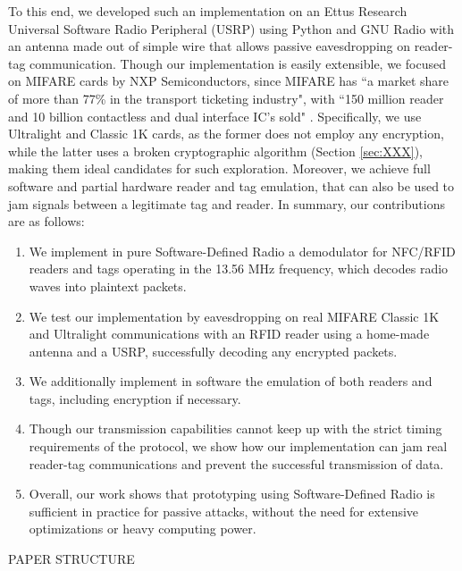 \documentclass[fleqn,10pt]{SelfArx} %
\begin{document}
To this end, we developed such an implementation on an Ettus Research Universal Software Radio Peripheral (USRP) using Python and GNU Radio with an antenna made out of simple wire that allows passive eavesdropping on reader-tag communication. Though our implementation is easily extensible, we focused on MIFARE cards by NXP Semiconductors, since MIFARE has ``a market share of more than 77\% in the transport ticketing industry", with ``150 million reader and 10 billion contactless and dual interface IC's sold" \cite{mifare}. Specifically, we use Ultralight \cite{ultralight} and Classic 1K \cite{classic1k} cards, as the former does not employ any encryption, while the latter uses a broken cryptographic algorithm (Section \ref{sec:XXX}), making them ideal candidates for such exploration. Moreover, we achieve full software and partial hardware reader and tag emulation, that can also be used to jam signals between a legitimate tag and reader. In summary, our contributions are as follows:

\begin{enumerate}[noitemsep]
\item We implement in pure Software-Defined Radio a demodulator for NFC/RFID readers and tags operating in the 13.56 MHz frequency, which decodes radio waves into plaintext packets.
\item We test our implementation by eavesdropping on real MIFARE Classic 1K and Ultralight communications with an RFID reader using a home-made antenna and a USRP, successfully decoding any encrypted packets.
\item We additionally implement in software the emulation of both readers and tags, including encryption if necessary.
\item Though our transmission capabilities cannot keep up with the strict timing requirements of the protocol, we show how our implementation can jam real reader-tag communications and prevent the successful transmission of data.
\item Overall, our work shows that prototyping using Software-Defined Radio is sufficient in practice for passive attacks, without the need for extensive optimizations or heavy computing power.
\end{enumerate}

PAPER STRUCTURE


\end{document}
